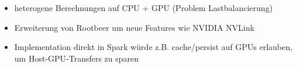 \begin{frame}
\begin{itemize}

       \item heterogene Berechnungen auf CPU + GPU (Problem Lastbalancierung) %
       \item Erweiterung von Rootbeer um neue Features wie NVIDIA NVLink
       \item Implementation direkt in Spark würde z.B. cache/persist auf GPUs erlauben, um Host-GPU-Transfers zu sparen
    \end{itemize}
\end{frame}



